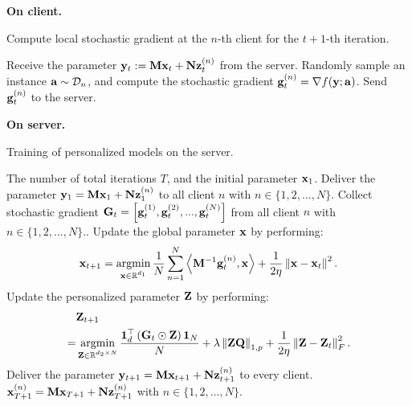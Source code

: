 \documentclass[journal]{IEEEtran}
\newcommand\algotext[1]{\end{algorithmic}#1\begin{algorithmic}[1]}
\begin{document}
\textbf{On client.}  

\begin{algorithm}[!t]
    \caption{Compute local stochastic gradient at the $n$-th client for the $t+1$-th iteration.}
    \label{algo_xxx}
    \begin{algorithmic}[1]
        \State Receive the parameter ${\bf y}_t := {\bf M}{\bf x}_t + {\bf N}{\bf z}_t^{(n)}$ from the server.
        \State Randomly sample an instance ${\bf a}\sim\mathcal{D}_n$, and compute the stochastic gradient ${\bf g}^{(n)}_t = \nabla f({\bf y};{\bf a})$.
        \State Send ${\bf g}^{(n)}_t$ to the server.
    \end{algorithmic}
\end{algorithm} 





\textbf{On server.}

\begin{algorithm}[!t]
    \caption{Training of personalized models on the server.}
    \label{algo_xxx}
    \begin{algorithmic}[1]
        \Require The number of total iterations $T$, and the initial parameter ${\bf x}_1$.
        \State Deliver the parameter ${\bf y}_1 = {\bf M}{\bf x}_1 + {\bf N}{\bf z}_1^{(n)}$ to all client $n$ with $n\in\{1,2, ..., N\}$.
            \State Collect stochastic gradient ${\bf G}_t = \left [ {\bf g}_t^{(1)}, {\bf g}_t^{(2)}, ..., {\bf g}_t^{(N)} \right ]$ from all client $n$ with $n\in\{1,2, ..., N\}$..
            \State Update the global parameter ${\bf x}$ by performing:
            $$ \x_{t+1} = \argmin_{\substack{\x\in\RR^{d_1}}} \frac{1}{N}\sum_{n=1}^N \lrangle{\M^{-1}\g_t^{(n)}, \x} + \frac{1}{2\eta}\lrnorm{\x - \x_t}^2.$$
            \State Update the personalized parameter ${\bf Z}$ by performing:
            \begin{align}
            \nonumber
            &\Z_{t+1} \\ \nonumber
            = & \argmin_{\substack{\Z\in\RR^{d_2\times N}}} \frac{\1_d^\top\lrincir{\G_t \odot \Z}\1_N}{N} + \lambda \lrnorm{\Z\Q}_{1,p} + \frac{1}{2\eta}\lrnorm{\Z - \Z_t}_F^2.
            \end{align}
            \State Deliver the parameter ${\bf y}_{t+1} = {\bf M}{\bf x}_{t+1} + {\bf N}{\bf z}_{t+1}^{(n)}$ to every client.
        \EndFor
        \Return ${\bf x}_{T+1}^{(n)} = {\bf M}{\bf x}_{T+1} + {\bf N}{\bf z}_{T+1}^{(n)}$ with $n\in\{1,2, ..., N\}$.
      \end{algorithmic}
\end{algorithm} 
\end{document}
